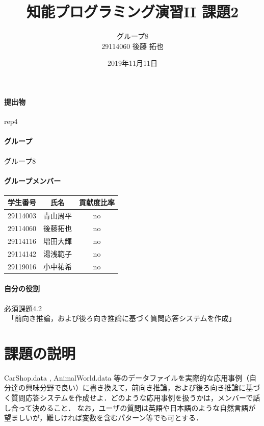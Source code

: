 \documentclass[uplatex,12pt]{jsarticle}
\title{知能プログラミング演習II 課題2}
\author{グループ8\\
  29114060 後藤 拓也\\
}
\date{2019年11月11日}
\begin{document}
\maketitle

\paragraph{提出物} rep4

\paragraph{グループ} グループ8

\paragraph{グループメンバー}
\begin{center}
\begin{tabular}{|c|c|c|}
  \hline
  学生番号&氏名&貢献度比率\\
  \hline\hline
  29114003&青山周平&no\\
  \hline
  29114060&後藤拓也&no\\
  \hline
  29114116&増田大輝&no\\
  \hline
  29114142&湯浅範子&no\\
  \hline
  29119016&小中祐希&no\\
  \hline
\end{tabular}
\end{center}
\paragraph{自分の役割} 必須課題4.2
\\　「前向き推論，および後ろ向き推論に基づく質問応答システムを作成」
\section{課題の説明}
\begin{screen}
CarShop.data , AnimalWorld.data 等のデータファイルを実際的な応用事例（自分達の興味分野で良い）に書き換えて，前向き推論，および後ろ向き推論に基づく質問応答システムを作成せよ．どのような応用事例を扱うかは，メンバーで話し合って決めること．
なお，ユーザの質問は英語や日本語のような自然言語が望ましいが，難しければ変数を含むパターン等でも可とする．
\end{screen}
\end{document}
